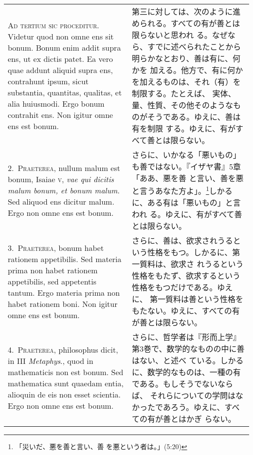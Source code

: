 \documentclass[10pt]{jsarticle}
\begin{document}
\begin{longtable}{p{21em}p{21em}}



{\huge A}{\scshape d tertium sic proceditur}. Videtur quod non omne ens
 sit bonum. Bonum enim addit supra ens, ut ex dictis patet. Ea vero quae
 addunt aliquid supra ens, contrahunt ipsum, sicut substantia,
 quantitas, qualitas, et alia huiusmodi. Ergo bonum contrahit ens. Non
 igitur omne ens est bonum.

&

第三に対しては、次のように進められる。すべての有が善とは限らないと思われ
 る。なぜなら、すでに述べられたことから明らかなとおり、善は有に、何かを
 加える。他方で、有に何かを加えるものは、それ（有）を制限する。たとえば、
 実体、量、性質、その他そのようなものがそうである。ゆえに、善は有を制限
 する。ゆえに、有がすべて善とは限らない。


\\

2.~{\scshape Praeterea}, nullum malum est bonum, Isaiae {\scshape v},
 {\itshape vae qui dicitis malum bonum, et bonum malum}. Sed aliquod ens
 dicitur malum. Ergo non omne ens est bonum.

&

さらに、いかなる「悪いもの」も善ではない。『イザヤ書』5章「ああ、悪を善
 と言い、善を悪と言うあなた方よ」。\footnote{「災いだ、悪を善と言い、善
 を悪という者は。」(5:20)}しかるに、ある有は「悪いもの」と言われ
 る。ゆえに、有がすべて善とは限らない。

\\

3.~{\scshape Praeterea}, bonum habet rationem appetibilis. Sed materia
 prima non habet rationem appetibilis, sed appetentis tantum. Ergo
 materia prima non habet rationem boni. Non igitur omne ens est bonum.

&

さらに、善は、欲求されうるという性格をもつ。しかるに、第一質料は、欲求さ
 れうるという性格をもたず、欲求するという性格をもつだけである。ゆえに、
 第一質料は善という性格をもたない。ゆえに、すべての有が善とは限らない。

\\

4.~{\scshape Praeterea}, philosophus dicit, in III {\itshape Metaphys}.,
 quod in mathematicis non est bonum. Sed mathematica sunt quaedam entia,
 alioquin de eis non esset scientia. Ergo non omne ens est bonum.

&

さらに、哲学者は『形而上学』第3巻で、数学的なものの中に善はない、と述べ
 ている。しかるに、数学的なものは、一種の有である。もしそうでないならば、
 それらについての学問はなかったであろう。ゆえに、すべての有が善とはかぎ
 らない。


\end{longtable}
\end{document}
